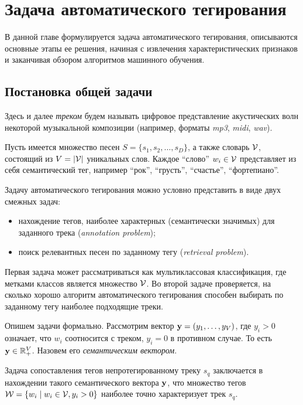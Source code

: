 \chapter{Задача автоматического тегирования}
\label{chapter1}

В данной \cite{ipl_cite,too_old_metrics} главе формулируется задача автоматического тегирования, описываются основные этапы ее решения, 
начиная с извлечения характеристических признаков и заканчивая обзором алгоритмов машинного обучения.

\section{Постановка общей задачи}
Здесь и далее \emph{треком} будем называть цифровое представление акустических волн некоторой музыкальной композиции (например, форматы \emph{mp3}, \emph{midi}, \emph{wav}).

Пусть имеется множество песен $S = \{s_1, s_2, \ldots, s_D \}$, а также словарь $ \mathcal{V} $, состоящий из $V = |\mathcal{V}| $ уникальных слов. 
Каждое ``слово'' $w_i \in \mathcal{V}$ представляет из себя семантический тег, например ``рок'', ``грусть'', ``счастье'', ``фортепиано''.

Задачу автоматического тегирования можно условно представить в виде двух смежных задач: 
\begin{itemize}
 \item нахождение тегов, наиболее характерных (семантически значимых) для заданного трека (\emph{annotation problem});
 \item поиск релевантных песен по заданному тегу (\emph{retrieval problem}).
\end{itemize}

Первая задача может рассматриваться как мультиклассовая классификация, где метками классов является множество $\mathcal{V}$.
Во второй задаче проверяется, на сколько хорошо алгоритм автоматического тегирования способен выбирать по заданному тегу наиболее подходящие треки.

Опишем задачи формально.
Рассмотрим вектор $\mathbf{y} = (y_1, \ldots, y_V)$, где $y_i > 0$ означает, что $w_i$ соотносится с треком, $y_i = 0$ в противном случае. То есть $\mathbf{y} \in \mathbb{R}^{V}_{+}$.
Назовем его \emph{семантическим вектором}.

Задача сопоставления тегов непротегированному треку $s_q$ заключается в нахождении такого семантического вектора $\mathbf{y}$, 
что множество тегов $\mathcal{W} = \{w_i \mid w_i \in \mathcal{V}, y_i > 0\}$ наиболее точно характеризует трек $s_q$.

